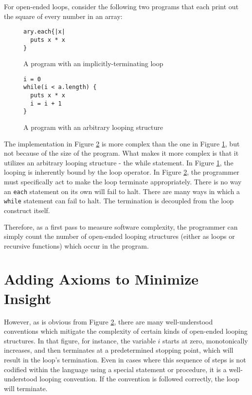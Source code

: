 For open-ended loops, consider the following two programs that each print out the square of every number in an array:

\begin{figure}[H]
\begin{mdframed}
\begin{verbatim}
ary.each{|x| 
  puts x * x
}
\end{verbatim}
\end{mdframed}
\caption{A program with an implicitly-terminating loop}
\label{fig:impterm}
\end{figure}

\begin{figure}[H]
\begin{mdframed}
\begin{verbatim}
i = 0
while(i < a.length) {
  puts x * x
  i = i + 1
}
\end{verbatim}
\end{mdframed}
\caption{A program with an arbitrary looping structure}
\label{fig:expterm}
\end{figure}

The implementation in Figure \ref{fig:expterm} is more complex than the one in Figure \ref{fig:impterm}, but not because of the size of the program.  What makes it more complex is that it utilizes an arbitrary looping structure - the while statement.  In Figure \ref{fig:impterm}, the looping is inherently bound by the loop operator.  In Figure \ref{fig:expterm}, the programmer must specifically act to make the loop terminate appropriately.  There is no way an \verb+each+ statement on its own will fail to halt.  There are many ways in which a \verb+while+ statement can fail to halt.  The termination is decoupled from the loop construct itself.

Therefore, as a first pass to measure software complexity, the programmer can simply count the number of open-ended looping structures (either as loops or recursive functions) which occur in the program.   

\section{Adding Axioms to Minimize Insight}

However, as is obvious from Figure \ref{fig:expterm}, there are many well-understood conventions which mitigate the complexity of certain kinds of open-ended looping structures.  In that figure, for instance, the variable $i$ starts at zero, monotonically increases, and then terminates at a predetermined stopping point, which will result in the loop's termination. Even in cases where this sequence of steps is not codified within the language using a special statement or procedure, it is a well-understood looping convention.  If the convention is followed correctly, the loop will terminate.

